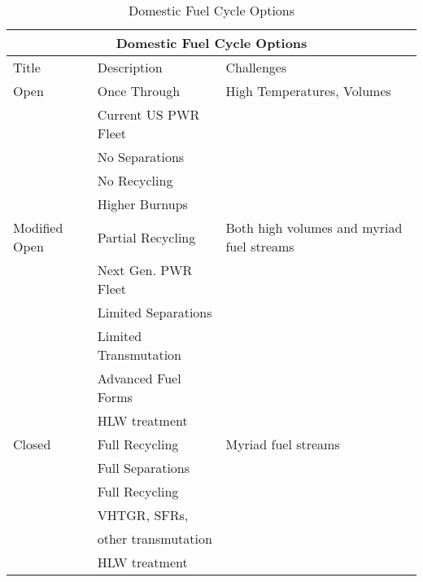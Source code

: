     \begin{table}
      \centering
      \footnotesize{
      \begin{tabular}{|l|l|l|}
        \multicolumn{3}{c}{\textbf{Domestic Fuel Cycle Options}}\\
        \hline
        Title & Description& Challenges \\
        \hline
        \hline
        Open          & Once Through         & High Temperatures, Volumes \\
                      & Current US PWR Fleet &      \\
                      & No Separations       &      \\
                      & No Recycling         &      \\
                      & Higher Burnups &      \\
        \hline
        Modified Open & Partial Recycling    & Both high volumes and myriad fuel streams \\
                      & Next Gen. PWR Fleet &      \\
                      & Limited Separations  &      \\
                      & Limited Transmutation &      \\
                      & Advanced Fuel Forms  &      \\
                      & HLW treatment    &          \\
        \hline
        Closed        & Full Recycling       & Myriad fuel streams \\
                      & Full Separations &      \\
                      & Full Recycling &      \\
                      & VHTGR, SFRs, &      \\
                      & other transmutation & \\
                      & HLW treatment  &      \\
        \hline
      \end{tabular}
      \caption[Fuel Cycle Options]{Domestic Fuel Cycle Options }
      \label{tab:fco}
      }
    \end{table}

